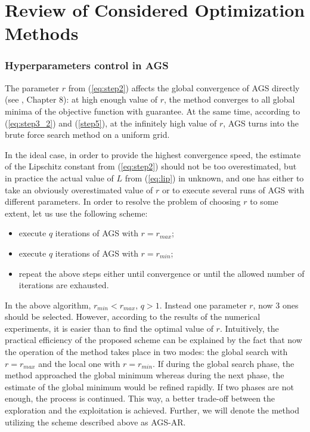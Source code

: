 \section{Review of Considered Optimization Methods}
\subsubsection{Hyperparameters control in AGS}

The parameter $r$ from (\ref{eq:step2}) affects the global convergence of AGS directly (see
\cite{strSergGO}, Chapter 8):
at high enough value of $r$, the method converges to all global minima of the objective function with
guarantee.
At the same time, according to (\ref{eq:step3_2}) and (\ref{step5}), at the infinitely high value of $r$, AGS turns into
the brute force search method on a uniform grid.

In the ideal case, in order to provide the highest convergence speed, the estimate of the Lipschitz
constant from (\ref{eq:step2})
should not be too overestimated, but in practice the actual value of $L$ from (\ref{eq:lip}) in
unknown, and one has either to take an obviously overestimated value of $r$ or to execute several
runs of AGS with different parameters. In order to resolve the problem of choosing $r$ to some extent,
let us use the following scheme:
\begin{itemize}
  \item execute $q$ iterations of AGS with $r=r_{max}$;
  \item execute $q$ iterations of AGS with $r=r_{min}$;
  \item repeat the above steps either until convergence or until the allowed number of iterations are
exhausted.
\end{itemize}

In the above algorithm, $r_{min} < r_{max}$, $q > 1$. Instead one parameter $r$, now
3 ones should be selected. However, according to the results of the numerical experiments, it is easier
than to find the optimal value of $r$.
Intuitively, the practical efficiency of the proposed scheme can be explained by the fact that now the
operation of the method takes place in two modes: the global search with $r=r_{max}$ and the local
one with $r=r_{min}$. If during the global search phase, the method approached the global minimum
whereas during the next phase, the estimate of the global minimum  would be refined rapidly.
If two phases are not enough, the process is continued. This way, a better trade-off
between the exploration and the exploitation is achieved.
Further, we will denote the method utilizing the scheme described above as AGS-AR.

